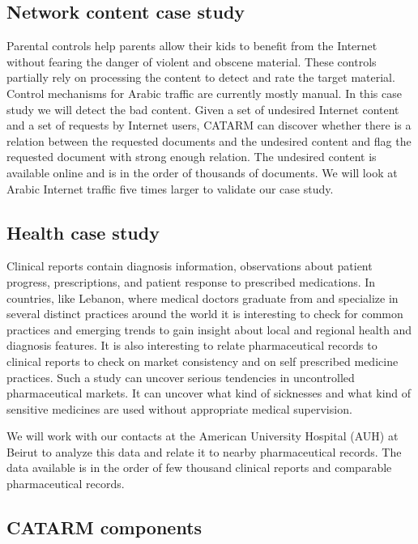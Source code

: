 \documentclass[12pt]{article}
\begin{document}
\subsection{Network content case study}
\label{s:design:net}

Parental controls help parents allow their kids to benefit 
from the Internet 
without fearing the danger of violent and obscene material. 
These controls partially rely on processing the content to detect 
and rate the target material. 
Control mechanisms for Arabic traffic are currently mostly manual. 
In this case study we will detect the bad content. 
Given a set of undesired Internet content 
and a set of requests by Internet users, 
CATARM can discover whether there is a relation between 
the requested documents and the undesired content and flag the 
requested document with strong enough relation. 
The undesired content is available online and is in the 
order of thousands of documents. 
We will look at Arabic Internet traffic five times larger to
validate our case study. 


\subsection{Health case study}
\label{s:design:med}

Clinical reports contain diagnosis information, observations about 
patient progress, prescriptions, and patient response to prescribed 
medications. 
In countries, like Lebanon, where medical doctors graduate from and 
specialize in 
several distinct practices around the world it is interesting to 
check for common practices and emerging trends to gain insight
about local and regional health and diagnosis features. 
It is also interesting to relate 
pharmaceutical 
records to clinical reports to check on 
market consistency and on self prescribed medicine 
practices.
Such a study can uncover serious tendencies in uncontrolled
pharmaceutical markets.
It can uncover what kind of sicknesses and what kind of
sensitive medicines are used without 
appropriate medical supervision. 

We will work with our contacts at the American University
Hospital (AUH) at Beirut to analyze this data and relate it
to nearby pharmaceutical records. 
The data available is in the order of few thousand clinical reports
and comparable pharmaceutical records. 


\subsection{CATARM components}
\label{s:design:components}
\end{document}
